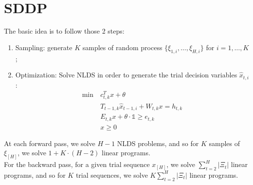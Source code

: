 \documentclass[12pt, openany]{report}
\theoremstyle{definition}
\begin{document}
\section{SDDP}
The basic idea is to follow those 2 steps:
\begin{enumerate}
	\item Sampling: generate $K$ samples of random process $\{\xi_{1,i},\dots, \xi_{H,i}\}$ for $i=1,\dots, K$;
	\item Optimization: Solve NLDS in order to generate the trial decision variables $\hat x_{t,i}$:
	\begin{equation}
		\begin{aligned}
			\min\ & c_{t,k}^Tx+\theta\\
			& T_{t-1,k}\hat x_{t-1,i} + W_{t,k}x = h_{t,k}\\
			& E_{t,k}x+\theta \cdot \mathbb{1} \ge e_{t,k}\\
			&x\ge 0
		\end{aligned}
	\end{equation}
\end{enumerate}
At each forward pass, we solve $H-1$ NLDS problems, and so for $K$ samples of $\xi_{[H]}$, we solve $1+K\cdot (H-2)$ linear programs. \\
For the backward pass, for a given trial sequence $x_{[H]}$, we solve $\sum_{t=2}^H|\Xi_t|$ linear programs, and so for $K$ trial sequences, we solve $K\sum_{t=2}^H|\Xi_t|$ linear programs. 
\end{document}
